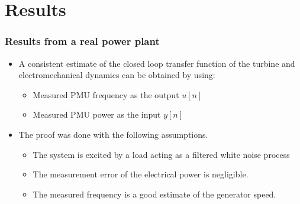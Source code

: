 \section{Results}
\begin{frame}
	\frametitle{Results from a real power plant}
	\begin{itemize}
		\item<1-> A consistent estimate of the closed loop transfer function of the turbine and electromechanical dynamics can be obtained by using:
			\begin{itemize}
				\item<2-> Measured PMU frequency as the output $u[n]$
				\item<3-> Measured PMU power as the input $y[n]$
			\end{itemize}
		\item<4-> The proof was done with the following assumptions.
			\begin{itemize}
				\item The system is excited by a load acting as a filtered white noise process
				\item The measurement error of the electrical power is negligible.
				\item The measured frequency is a good estimate of the generator speed.
			\end{itemize}
	\end{itemize}
\end{frame}
